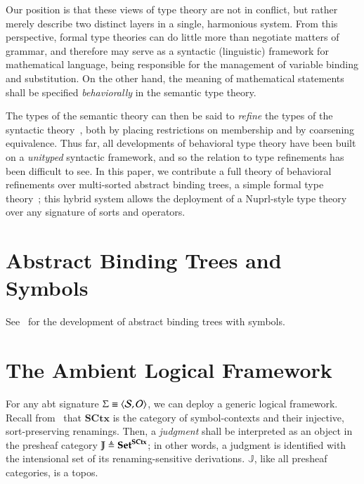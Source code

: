 \documentclass[11pt]{article}
\newif\ifcolored%
\theoremstyle{definition}
\theoremstyle{remark}
\numberwithin{equation}{section}
\def\IModeColorName{MidnightBlue}
\def\OModeColorName{Maroon}
\def\IModeColorName{Black}
\def\OModeColorName{Black}
\newcommand\IMode[1]{{\color{\IModeColorName}{#1}}}
\newcommand\OMode[1]{{\color{\OModeColorName}{#1}}}
\newcommand\Match[2]{\IMode{#1}\equiv\OMode{#2}}
\newcommand\Sorts{\mathcal{S}}
\newcommand\Operators{\mathcal{O}}
\newcommand\Sets{\mathbf{Set}}
\newcommand\SCtx{\mathbf{SCtx}}
\newcommand\Pair[2]{\left\langle#1, #2 \right\rangle}
\newcommand\Define[2]{\IMode{#1}\triangleq\OMode{#2}}
\begin{document}
Our position is that these views of type theory are not in conflict, but rather
merely describe two distinct layers in a single, harmonious system. From this
perspective, formal type theories can do little more than negotiate matters of
grammar, and therefore may serve as a syntactic (linguistic) framework
for mathematical language, being responsible for the management of variable
binding and substitution. On the other hand, the meaning of mathematical
statements shall be specified \emph{behaviorally} in the semantic type
theory.

The types of the semantic theory can then be said to \emph{refine} the types of
the syntactic theory~\cite{harper-davies:2014, harper-duff:2015, harper:2016},
both by placing restrictions on membership and by coarsening equivalence. Thus
far, all developments of behavioral type theory have been built on a
\emph{unityped} syntactic framework, and so the relation to type refinements
has been difficult to see. In this paper, we contribute a full theory of
behavioral refinements over multi-sorted abstract binding trees, a simple
formal type theory~\cite{harper:2016, sterling-morrison:2015}; this hybrid
system allows the deployment of a Nuprl-style type theory over any signature of
sorts and operators.

\section{Abstract Binding Trees and Symbols}

See~\cite{sterling-morrison:2015} for the development of abstract binding trees
with symbols. 

\section{The Ambient Logical Framework}

\ifcolored%
In this paper, we hint at the \emph{modes} of judgments and
assertions~\cite{harper:2016} using colors, marking inputs with
$\IMode{\texttt{blue}}$ and outputs with $\OMode{\texttt{red}}$. As a rule of
thumb, inputs are things which are supplied when checking the correctness of a
judgment, and outputs are things which are synthesized in the process. \fi

For any abt signature $\Match{\Sigma}{\Pair{\Sorts}{\Operators}}$, we can deploy
a generic logical framework. Recall from~\cite{sterling-morrison:2015} that
$\SCtx$ is the category of symbol-contexts and their injective, sort-preserving
renamings. Then, a \emph{judgment} shall be interpreted as an object in the presheaf
category $\Define{\mathbb{J}}{\Sets^\SCtx}$; in other words, a
judgment is identified with the intensional set of its renaming-sensitive
derivations. $\mathbb{J}$, like all presheaf categories, is a topos.
\end{document}
